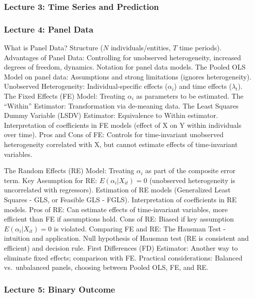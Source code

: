 \documentclass[
]{article}
\begin{document}
\subsubsection{Lecture 3: Time Series and
Prediction}\label{lecture-3-time-series-and-prediction}

\subsubsection{Lecture 4: Panel Data}\label{lecture-4-panel-data}

What is Panel Data? Structure (\(N\) individuals/entities, \(T\) time
periods). Advantages of Panel Data: Controlling for unobserved
heterogeneity, increased degrees of freedom, dynamics. Notation for
panel data models. The Pooled OLS Model on panel data: Assumptions and
strong limitations (ignores heterogeneity). Unobserved Heterogeneity:
Individual-specific effects (\(\alpha_i\)) and time effects
(\(\lambda_t\)). The Fixed Effects (FE) Model: Treating \(\alpha_i\) as
parameters to be estimated. The ``Within'' Estimator: Transformation via
de-meaning data. The Least Squares Dummy Variable (LSDV) Estimator:
Equivalence to Within estimator. Interpretation of coefficients in FE
models (effect of X on Y within individuals over time). Pros and Cons of
FE: Controls for time-invariant unobserved heterogeneity correlated with
X, but cannot estimate effects of time-invariant variables.

The Random Effects (RE) Model: Treating \(\alpha_i\) as part of the
composite error term. Key Assumption for RE: \(E(\alpha_i|X_{it}) = 0\)
(unobserved heterogeneity is uncorrelated with regressors). Estimation
of RE models (Generalized Least Squares - GLS, or Feasible GLS - FGLS).
Interpretation of coefficients in RE models. Pros of RE: Can estimate
effects of time-invariant variables, more efficient than FE if
assumptions hold. Cons of RE: Biased if key
assumption\(E(\alpha_i|X_{it}) = 0\) is violated. Comparing FE and RE:
The Hausman Test - intuition and application. Null hypothesis of Hausman
test (RE is consistent and efficient) and decision rule. First
Differences (FD) Estimator: Another way to eliminate fixed effects;
comparison with FE. Practical considerations: Balanced vs.~unbalanced
panels, choosing between Pooled OLS, FE, and RE.

\subsubsection{Lecture 5: Binary
Outcome}\label{lecture-5-binary-outcome}
\end{document}
